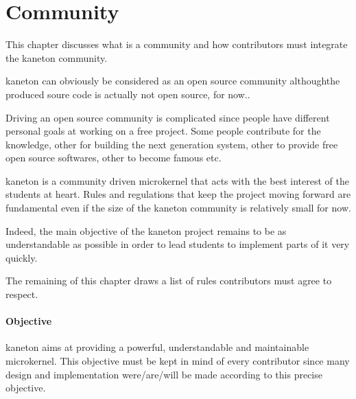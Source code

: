 %
%
%
%
%
%

%
%

\chapter{Community}
\label{chapter:community}

This chapter discusses what is a community and how contributors must integrate
the kaneton community.

\newpage

%
%

kaneton can obviously be considered as an open source community althoughthe
produced soure code is actually not open source, for now..

Driving an open source community is complicated since people have different
personal goals at working on a free project. Some people contribute for
the knowledge, other for building the next generation system, other to
provide free open source softwares, other to become famous etc.

kaneton is a community driven microkernel that acts with the best interest of
the students at heart. Rules and regulations that keep the project moving
forward are fundamental even if the size of the kaneton community is
relatively small for now.

Indeed, the main objective of the kaneton project remains to be as
understandable as possible in order to lead students to implement parts of
it very quickly.

The remaining of this chapter draws a list of rules contributors must agree
to respect.


\subsubsection{Objective}

kaneton aims at providing a powerful, understandable and maintainable
microkernel. This objective must be kept in mind of every contributor
since many design and implementation were/are/will be made according to
this precise objective.

